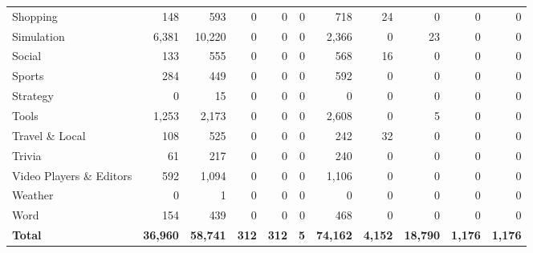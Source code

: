 \begin{table}[p]
\begin{tabular}{lrrrrrrrrrr}
        Shopping & 148 & 593 & 0 & 0 & 0 & 718 & 24 & 0 & 0 & 0 \\
        Simulation & 6,381 & 10,220 & 0 & 0 & 0 & 2,366 & 0 & 23 & 0 & 0 \\
        Social & 133 & 555 & 0 & 0 & 0 & 568 & 16 & 0 & 0 & 0 \\
        Sports & 284 & 449 & 0 & 0 & 0 & 592 & 0 & 0 & 0 & 0 \\
        Strategy & 0 & 15 & 0 & 0 & 0 & 0 & 0 & 0 & 0 & 0 \\
        Tools & 1,253 & 2,173 & 0 & 0 & 0 & 2,608 & 0 & 5 & 0 & 0 \\
        Travel \& Local & 108 & 525 & 0 & 0 & 0 & 242 & 32 & 0 & 0 & 0 \\
        Trivia & 61 & 217 & 0 & 0 & 0 & 240 & 0 & 0 & 0 & 0 \\
        Video Players \& Editors & 592 & 1,094 & 0 & 0 & 0 & 1,106 & 0 & 0 & 0 & 0 \\
        Weather & 0 & 1 & 0 & 0 & 0 & 0 & 0 & 0 & 0 & 0 \\
        Word & 154 & 439 & 0 & 0 & 0 & 468 & 0 & 0 & 0 & 0 \\
        \midrule
        \textbf{Total} & \textbf{36,960} & \textbf{58,741} & \textbf{312} & \textbf{312} & \textbf{5} & \textbf{74,162} & \textbf{4,152} & \textbf{18,790} & \textbf{1,176} & \textbf{1,176} \\
        \bottomrule
    \end{tabular}
\end{table}
